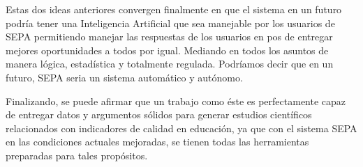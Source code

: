 \documentclass[a4paper,12pt,openany,oneside]{book}
\begin{document}
Estas dos ideas anteriores convergen finalmente en que el sistema en un futuro podría tener una Inteligencia Artificial que sea manejable por los usuarios de SEPA permitiendo manejar las respuestas de los usuarios en pos de entregar mejores oportunidades a todos por igual. Mediando en todos los asuntos de manera lógica, estadística y totalmente regulada. Podríamos decir que en un futuro, SEPA seria un sistema automático y autónomo.

Finalizando, se puede afirmar que un trabajo como éste es perfectamente capaz de entregar datos y argumentos sólidos para generar estudios científicos relacionados con indicadores de calidad en educación, ya que con el sistema SEPA en las condiciones actuales mejoradas, se tienen todas las herramientas preparadas para tales propósitos. 



\end{document}
